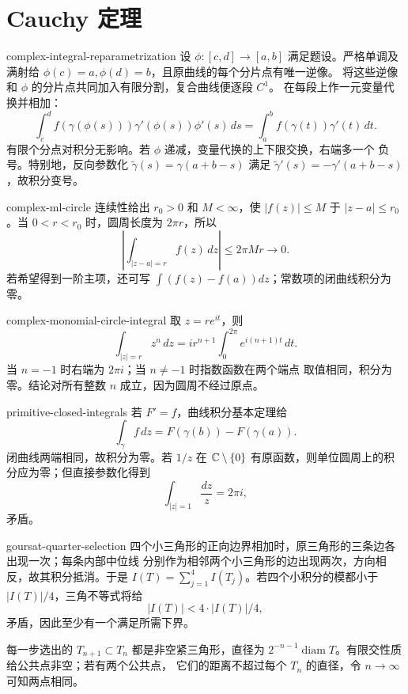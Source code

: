 \chapter{Cauchy 定理}
\label{chap:cauchy-theorem-solutions}

\begin{solution}{complex-integral-reparametrization}
设 \(\phi:[c,d]\to[a,b]\) 满足题设。严格单调及满射给
\(\phi(c)=a,\phi(d)=b\)，且原曲线的每个分片点有唯一逆像。
将这些逆像和 \(\phi\) 的分片点共同加入有限分割，复合曲线便逐段 \(C^1\)。
在每段上作一元变量代换并相加：
\[
 \int_c^d f(\gamma(\phi(s)))\gamma'(\phi(s))\phi'(s)\,ds
 =\int_a^b f(\gamma(t))\gamma'(t)\,dt.
\]
有限个分点对积分无影响。若 \(\phi\) 递减，变量代换的上下限交换，右端多一个
负号。特别地，反向参数化
\(\widetilde\gamma(s)=\gamma(a+b-s)\) 满足
\(\widetilde\gamma'(s)=-\gamma'(a+b-s)\)，故积分变号。
\end{solution}

\begin{solution}{complex-ml-circle}
连续性给出 \(r_0>0\) 和 \(M<\infty\)，使
\(|f(z)|\le M\) 于 \(|z-a|\le r_0\)。当 \(0<r<r_0\) 时，圆周长度为
\(2\pi r\)，所以
\[
 \left|\int_{|z-a|=r}f(z)\,dz\right|\le 2\pi Mr\longrightarrow0.
\]
若希望得到一阶主项，还可写
\(\int(f(z)-f(a))dz\)；常数项的闭曲线积分为零。
\end{solution}

\begin{solution}{complex-monomial-circle-integral}
取 \(z=re^{it}\)，则
\[
 \int_{|z|=r}z^n\,dz
 =ir^{n+1}\int_0^{2\pi}e^{i(n+1)t}\,dt.
\]
当 \(n=-1\) 时右端为 \(2\pi i\)；当 \(n\ne-1\) 时指数函数在两个端点
取值相同，积分为零。结论对所有整数 \(n\) 成立，因为圆周不经过原点。
\end{solution}

\begin{solution}{primitive-closed-integrals}
若 \(F'=f\)，曲线积分基本定理给
\[
 \int_\gamma f\,dz=F(\gamma(b))-F(\gamma(a)).
\]
闭曲线两端相同，故积分为零。若 \(1/z\) 在
\(\mathbb{C}\setminus\{0\}\) 有原函数，则单位圆周上的积分应为零；但直接参数化得到
\[
 \int_{|z|=1}\frac{dz}{z}=2\pi i,
\]
矛盾。
\end{solution}

\begin{solution}{goursat-quarter-selection}
四个小三角形的正向边界相加时，原三角形的三条边各出现一次；每条内部中位线
分别作为相邻两个小三角形的边出现两次，方向相反，故其积分抵消。于是
\(I(T)=\sum_{j=1}^4I(T_j)\)。若四个小积分的模都小于
\(|I(T)|/4\)，三角不等式将给
\[
 |I(T)|<4\cdot |I(T)|/4,
\]
矛盾，因此至少有一个满足所需下界。

每一步选出的 \(T_{n+1}\subset T_n\) 都是非空紧三角形，直径为
\(2^{-n-1}\operatorname{diam}T\)。有限交性质给公共点非空；若有两个公共点，
它们的距离不超过每个 \(T_n\) 的直径，令 \(n\to\infty\) 可知两点相同。
\end{solution}

